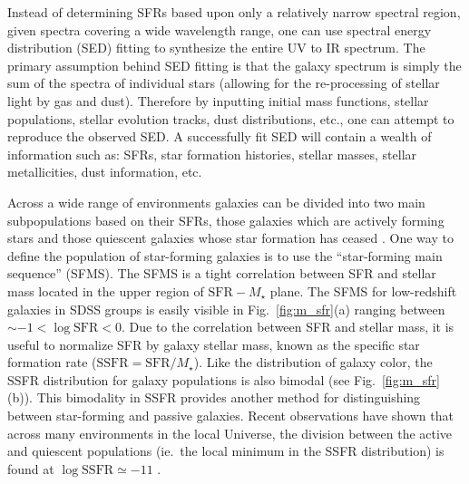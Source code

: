 \par
Instead of determining SFRs based upon only a relatively narrow
spectral region, given spectra covering a wide wavelength range, one
can use spectral energy distribution (SED) fitting to synthesize the
entire UV to IR spectrum.  The primary assumption behind SED fitting
is that the galaxy spectrum is simply the sum of the spectra of
individual stars (allowing for the re-processing of stellar light by
gas and dust).  Therefore by inputting initial mass functions, stellar
populations, stellar evolution tracks, dust distributions, etc.,
one can attempt to reproduce the observed SED.  A successfully fit SED
will contain a wealth of information such as: SFRs, star formation
histories, stellar masses, stellar metallicities, dust information, etc.
\par
Across a wide range of environments galaxies
can be divided into two main subpopulations based on their SFRs, those
galaxies which are actively forming stars and those quiescent galaxies
whose star formation has ceased \citep{wetzel2012}.  One way to
define the population of star-forming galaxies is to use the
``star-forming main sequence'' (SFMS).  The SFMS is a tight
correlation between SFR and stellar mass located in the upper region
of $\mathrm{SFR} - M_\star$ plane.  The SFMS for low-redshift galaxies
in SDSS groups is easily visible in Fig.~\ref{fig:m_sfr}(a) ranging
between $\sim -1 < \log \mathrm{SFR} < 0$.  Due to the correlation
between SFR and stellar mass, it is useful to normalize SFR by galaxy
stellar mass, known as the specific star formation rate
($\mathrm{SSFR} = \mathrm{SFR}/M_\star$).  Like the distribution of
galaxy color, the SSFR distribution for galaxy populations is also
bimodal (see Fig.~\ref{fig:m_sfr}(b)).  This bimodality in SSFR
provides another method for distinguishing between star-forming and
passive galaxies.  Recent observations have shown that across
many environments in the local Universe, the division between
the active and quiescent populations (ie.\ the local minimum in the
SSFR distribution) is found at $\log \mathrm{SSFR} \simeq -11$
\citep{wetzel2012}.

